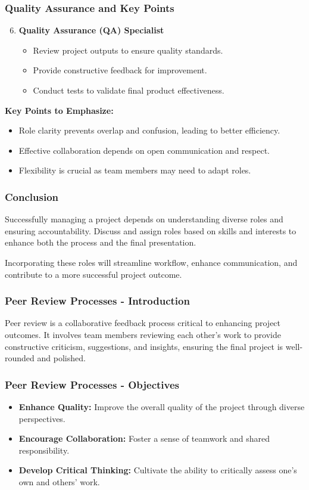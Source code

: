 \documentclass[aspectratio=169]{beamer}
\begin{document}
\begin{frame}[fragile]
    \frametitle{Quality Assurance and Key Points}
    \begin{enumerate}
        \setcounter{enumi}{5} %
        \item \textbf{Quality Assurance (QA) Specialist}
        \begin{itemize}
            \item Review project outputs to ensure quality standards.
            \item Provide constructive feedback for improvement.
            \item Conduct tests to validate final product effectiveness.
        \end{itemize}
    \end{enumerate}
    
    \textbf{Key Points to Emphasize:}
    \begin{itemize}
        \item Role clarity prevents overlap and confusion, leading to better efficiency.
        \item Effective collaboration depends on open communication and respect.
        \item Flexibility is crucial as team members may need to adapt roles.
    \end{itemize}
\end{frame}

\begin{frame}[fragile]
    \frametitle{Conclusion}
    Successfully managing a project depends on understanding diverse roles and ensuring accountability. Discuss and assign roles based on skills and interests to enhance both the process and the final presentation.
    
    Incorporating these roles will streamline workflow, enhance communication, and contribute to a more successful project outcome.
\end{frame}

\begin{frame}[fragile]
    \frametitle{Peer Review Processes - Introduction}
    Peer review is a collaborative feedback process critical to enhancing project outcomes. 
    It involves team members reviewing each other's work to provide constructive criticism, 
    suggestions, and insights, ensuring the final project is well-rounded and polished.
\end{frame}

\begin{frame}[fragile]
    \frametitle{Peer Review Processes - Objectives}
    \begin{itemize}
        \item \textbf{Enhance Quality:} Improve the overall quality of the project through diverse perspectives.
        \item \textbf{Encourage Collaboration:} Foster a sense of teamwork and shared responsibility.
        \item \textbf{Develop Critical Thinking:} Cultivate the ability to critically assess one's own and others' work.
    \end{itemize}
\end{frame}
\end{document}
